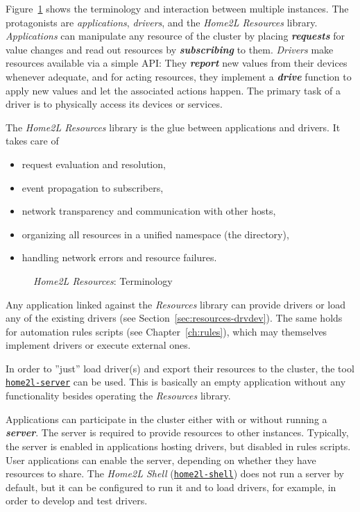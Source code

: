 \documentclass[12pt,english,parskip=half,headheight=19pt]{scrreprt}
\newcommand{\figsvg}[2][]{}            %
\newcommand{\figsvg}[2][]{\href{#2}{}} %
\newcommand{\idx}[1]{#1\index{#1}}
\newcommand{\reftool}[1]{\hyperref[tool:#1]{\texttt{\idx{#1}}}}
\begin{document}
Figure~\ref{fig:resources-terminology} shows the terminology and interaction between multiple instances. The protagonists are \textit{applications}, \textit{drivers}, and the \textit{Home2L Resources} library.
\textit{Applications} can manipulate any resource of the cluster by placing \textbf{\textit{requests}} for value changes and read out resources by \textbf{\textit{subscribing}} to them. \textit{Drivers} make resources available via a simple API: They \textbf{\textit{report}} new values from their devices whenever adequate, and for acting resources, they implement a \textbf{\textit{drive}} function to apply new values and let the associated actions happen. The primary task of a driver is to physically access its devices or services.

The \textit{Home2L Resources} library is the glue between applications and drivers. It takes care of
\begin{itemize}
  \item request evaluation and resolution,
  \item event propagation to subscribers,
  \item network transparency and communication with other hosts,
  \item organizing all resources in a unified namespace (the directory),
  \item handling network errors and resource failures.
\end{itemize}

\begin{figure}[ht]
  \centering
  \figsvg[width=\linewidth]{figs/resources-terminology.svg}
  \caption[l]{\textit{Home2L Resources}: Terminology}
  \label{fig:resources-terminology}
\end{figure}

Any application linked against the \textit{Resources} library can provide drivers or load any of the existing drivers (see Section~\ref{sec:resources-drvdev}). The same holds for automation rules scripts (see Chapter~\ref{ch:rules}), which may themselves implement drivers or execute external ones.

In order to ''just'' load driver(s) and export their resources to the cluster, the tool \reftool{home2l-server} can be used. This is basically an empty application without any functionality besides operating the \textit{Resources} library.

Applications can participate in the cluster either with or without running a \textbf{\textit{server}}. The server is required to provide resources to other instances. Typically, the server is enabled in applications hosting drivers, but disabled in rules scripts. User applications can enable the server, depending on whether they have resources to share. The \textit{Home2L Shell} (\reftool{home2l-shell}) does not run a server by default, but it can be configured to run it and to load drivers, for example, in order to develop and test drivers.
\end{document}
